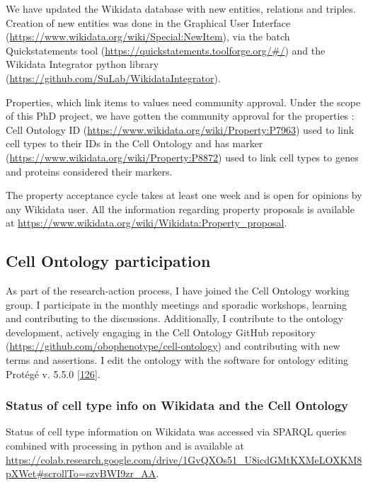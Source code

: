 We have updated the Wikidata database with new entities, relations and triples.
Creation of new entities was done in the Graphical User Interface (\url{https://www.wikidata.org/wiki/Special:NewItem}), via the batch Quickstatements tool (\url{https://quickstatements.toolforge.org/\#/}) and the Wikidata Integrator python library (\url{https://github.com/SuLab/WikidataIntegrator}).

Properties, which link items to values need community approval. Under the scope of this PhD project, we have gotten the community approval for the properties :
Cell Ontology ID (\url{https://www.wikidata.org/wiki/Property:P7963}) used to link cell types to their IDs in the Cell Ontology and has marker (\url{https://www.wikidata.org/wiki/Property:P8872}) used to link cell types to genes and proteins considered their markers.

The property acceptance cycle takes at least one week and is open for opinions by any Wikidata user.
All the information regarding property proposals is available at \url{https://www.wikidata.org/wiki/Wikidata:Property_proposal}.

\hypertarget{cell-ontology-participation}{%
\subsection{Cell Ontology participation}\label{cell-ontology-participation}}

As part of the research-action process, I have joined the Cell Ontology working group.
I participate in the monthly meetings and sporadic workshops, learning and contributing to the discussions.
Additionally, I contribute to the ontology development, actively engaging in the Cell Ontology GitHub repository (\url{https://github.com/obophenotype/cell-ontology}) and contributing with new terms and assertions.
I edit the ontology with the software for ontology editing Protégé v. 5.5.0 {[}\protect\hyperlink{ref-CHsAoEvr}{126}{]}.

\hypertarget{status-of-cell-type-info-on-wikidata-and-the-cell-ontology}{%
\subsubsection{Status of cell type info on Wikidata and the Cell Ontology}\label{status-of-cell-type-info-on-wikidata-and-the-cell-ontology}}

Status of cell type information on Wikidata was accessed via SPARQL queries combined with processing in python and is available at \url{https://colab.research.google.com/drive/1GvQXOs51_U8icdGMtKXMeLOXKM8pXWet\#scrollTo=szvBWI9zr_AA}.

